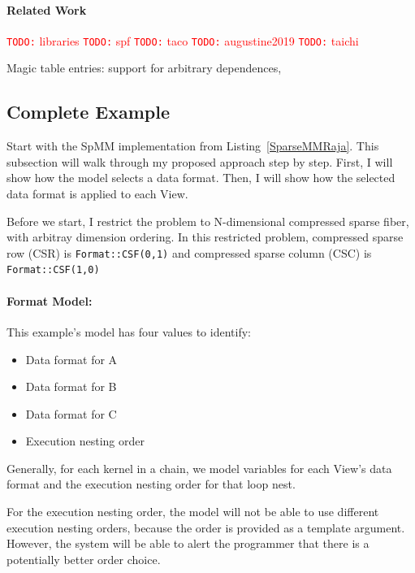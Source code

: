 \documentclass{article}
\newcommand{\todo}[1]{{\textcolor{red}{{\tt{TODO:}}\,\,#1 }}}
\begin{document}
\paragraph{Related Work}

\todo{libraries}
\todo{spf}
\todo{taco}
\todo{augustine2019}
\todo{taichi}


Magic table entries: support for arbitrary dependences, 

\subsection{Complete Example}

Start with the SpMM implementation from Listing~\ref{SparseMMRaja}.
This subsection will walk through my proposed approach step by step.
First, I will show how the model selects a data format. 
Then, I will show how the selected data format is applied to each View.

Before we start, I restrict the problem to N-dimensional compressed sparse fiber, with arbitray dimension ordering. 
In this restricted problem, compressed sparse row (CSR) is \verb.Format::CSF(0,1). and compressed sparse column (CSC) is  \verb.Format::CSF(1,0).

\paragraph{Format Model:}
This example's model has four values to identify:
\begin{itemize}
    \item Data format for A
    \item Data format for B
    \item Data format for C
    \item Execution nesting order
\end{itemize}
Generally, for each kernel in a chain, we model variables for each View's data format and the execution nesting order for that loop nest.


For the execution nesting order, the model will not be able to use different execution nesting orders, because the order is provided as a template argument. 
However, the system will be able to alert the programmer that there is a potentially better order choice.
\end{document}

